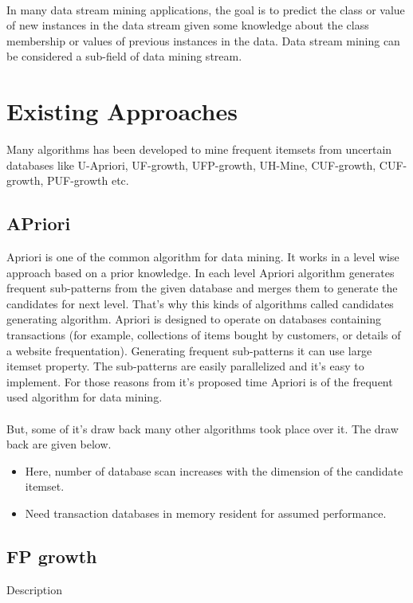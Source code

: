 \paragraph{}
In many data stream mining applications, the goal is to predict the class or value of new instances in the data stream given some knowledge about the class membership or values of previous instances in the data. Data stream mining can be considered a sub-field of data mining stream.
\section{Existing Approaches}
Many algorithms has been developed to mine frequent itemsets from uncertain databases like U-Apriori, UF-growth, UFP-growth, UH-Mine, CUF-growth, CUF-growth, PUF-growth etc.
\subsection{APriori}
Apriori is one of the common algorithm for data mining. It works in a level wise approach based on a prior knowledge. In each level Apriori algorithm generates frequent sub-patterns from the given database and merges them to generate the candidates for next level. That's why this kinds of algorithms called candidates generating algorithm.  Apriori is designed to operate on databases containing transactions (for example, collections of items bought by customers, or details of a website frequentation). Generating frequent sub-patterns it can use large itemset property. The sub-patterns are easily parallelized and it's easy to implement. For those reasons from it's proposed time Apriori is of the frequent used algorithm for data mining.
\paragraph{}
But, some of it's draw back many other algorithms took place over it. The draw back are given below.
\begin{itemize}
 \item Here, number of database scan increases with the dimension of the candidate itemset.
  \item Need transaction databases in memory resident for assumed performance.
\end{itemize}


\subsection{FP growth}
Description
